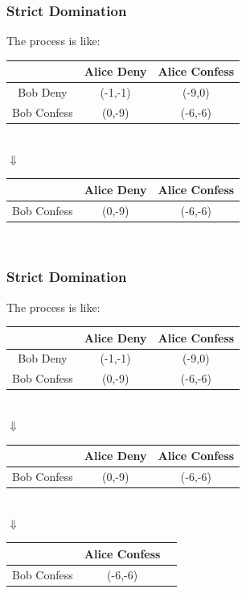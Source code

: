 \documentclass{beamer}
\begin{document}
\begin{frame}
\frametitle{Strict Domination}
The process is like:\\
\centering
\begin{tabular}{|c|c|c|}
\hline
\hline
    &{\color{red}Alice} Deny&{\color{red}Alice} Confess\\
\hline
{\color{blue}Bob} Deny& ({\color{blue}-1},{\color{red}-1}) & ({\color{blue}-9},{\color{red}0})\\
\hline
{\color{blue}Bob} Confess& ({\color{blue}0},{\color{red}-9}) & ({\color{blue}-6},{\color{red}-6})\\
\hline
\hline
\end{tabular}\\
$\Downarrow$\\
\begin{tabular}{|c|c|c|}
\hline
\hline
    &{\color{red}Alice} Deny&{\color{red}Alice} Confess\\
\hline
{\color{blue}Bob} Confess& ({\color{blue}0},{\color{red}-9}) & ({\color{blue}-6},{\color{red}-6})\\
\hline
\hline
\end{tabular}\\
\end{frame}

\begin{frame}
\frametitle{Strict Domination}
The process is like:\\
\centering
\begin{tabular}{|c|c|c|}
\hline
\hline
    &{\color{red}Alice} Deny&{\color{red}Alice} Confess\\
\hline
{\color{blue}Bob} Deny& ({\color{blue}-1},{\color{red}-1}) & ({\color{blue}-9},{\color{red}0})\\
\hline
{\color{blue}Bob} Confess& ({\color{blue}0},{\color{red}-9}) & ({\color{blue}-6},{\color{red}-6})\\
\hline
\hline
\end{tabular}\\
$\Downarrow$\\
\begin{tabular}{|c|c|c|}
\hline
\hline
    &{\color{red}Alice} Deny&{\color{red}Alice} Confess\\
\hline
{\color{blue}Bob} Confess& ({\color{blue}0},{\color{red}-9}) & ({\color{blue}-6},{\color{red}-6})\\
\hline
\hline
\end{tabular}\\
$\Downarrow$\\
\begin{tabular}{|c|c|c|}
\hline
\hline
    &{\color{red}Alice} Confess\\
\hline
{\color{blue}Bob} Confess& ({\color{blue}-6},{\color{red}-6})\\
\hline
\hline
\end{tabular}\\
\end{frame}
\end{document}
